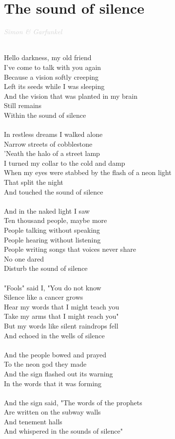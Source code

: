 \documentclass[a5paper, 10pt]{book}
\begin{document}
\section{The sound of silence}\textcolor{lightgray}{\textit{Simon \& Garfunkel}}\\~\\
\begin{minipage}[t]{0.7\textwidth}
Hello darkness, my old friend\\
I've come to talk with you again\\
Because a vision softly creeping\\
Left its seeds while I was sleeping\\
And the vision that was planted in my brain\\
Still remains\\
Within the sound of silence\\
\\
In restless dreams I walked alone\\
Narrow streets of cobblestone\\
'Neath the halo of a street lamp\\
I turned my collar to the cold and damp\\
When my eyes were stabbed by the flash of a neon light\\
That split the night\\
And touched the sound of silence\\
\\
And in the naked light I saw\\
Ten thousand people, maybe more\\
People talking without speaking\\
People hearing without listening\\
People writing songs that voices never share\\
No one dared\\
Disturb the sound of silence\\
\\
"Fools" said I, "You do not know\\
Silence like a cancer grows\\
Hear my words that I might teach you\\
Take my arms that I might reach you"\\
But my words like silent raindrops fell\\
And echoed in the wells of silence\\
\\
And the people bowed and prayed\\
To the neon god they made\\
And the sign flashed out its warning\\
In the words that it was forming\\
\\
And the sign said, "The words of the prophets\\
Are written on the subway walls\\
And tenement halls\\
And whispered in the sounds of silence"\\
\end{minipage}
\end{document}
